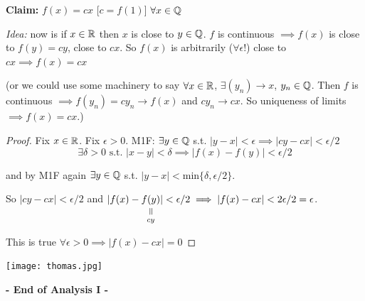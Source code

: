 \documentclass[twoside]{scrartcl}
\begin{document}
\textbf{Claim:} $f(x) = cx$ [$c = f(1)$] $\forall x \in\mathbb{Q}$

\emph{Idea:} now is if $x \in\mathbb{R}$ then $x$ is close to $y \in\mathbb{Q}$. $f$ is continuous $\implies f(x)$ is close to $f(y) = cy$, close to $cx$. So $f(x)$ is arbitrarily ($\forall \epsilon!$) close to $cx \implies f(x) = cx$

(or we could use some machinery to say $\forall x \in\mathbb{R}$, $\exists (y_n) \to x$, $y_n \in\mathbb{Q}$. Then $f$ is continuous $\implies f(y_n) = cy_n \to f(x)$ and $cy_n \to cx$. So uniqueness of limits $\implies f(x) = cx$.) 

\begin{proof}
Fix $x \in\mathbb{R}$. Fix $\epsilon >0$. M1F: $\exists y \in\mathbb{Q}$ s.t. $|y-x| < \epsilon \implies |cy - cx| < \epsilon/2$
\[\exists \delta >0\text{ s.t. }|x-y| < \delta \implies |f(x) - f(y)| < \epsilon/2\]

and by M1F again $\exists y\in\mathbb{Q}$ s.t. $|y-x| < \mathrm{min}\{\delta,\epsilon/2\}$. 

So $|cy-cx|< \epsilon/2$ and $|f(x) - \equalto{f(y)}{cy}| < \epsilon/2 \implies |f(x) - cx| < 2\epsilon/2 = \epsilon$. 

This is true $\forall \epsilon >0 \implies |f(x) -cx| = 0$
\end{proof}

\vspace*{20pt}


  \begin{center}
  \texttt{[image: thomas.jpg]}
  \vspace*{20pt}
  
  \textsf{\textbf{- End of Analysis I -}}	
  \end{center}
  
  
\end{document}
